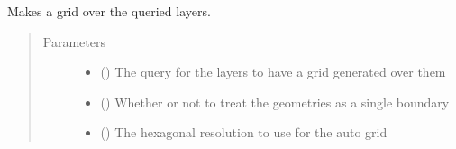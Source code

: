 \documentclass[letterpaper,10pt,english]{sphinxmanual}
\begin{document}
\begin{fulllineitems}
\begin{fulllineitems}
\label{\detokenize{builder:geohexviz.builder.PlotBuilder.auto_grid}}
\sphinxAtStartPar
Makes a grid over the queried layers.
\begin{quote}\begin{description}
\item[{Parameters}] \leavevmode\begin{itemize}
\item {} 
\sphinxAtStartPar
{} () \textendash{} The query for the layers to have a grid generated over them

\item {} 
\sphinxAtStartPar
{} () \textendash{} Whether or not to treat the  geometries as a single boundary

\item {} 
\sphinxAtStartPar
{} () \textendash{} The hexagonal resolution to use for the auto grid

\end{itemize}

\end{description}\end{quote}

\end{fulllineitems}



\end{fulllineitems}
\end{document}
